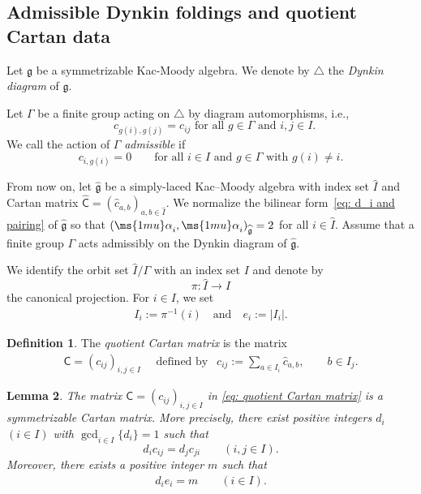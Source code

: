 \documentclass[12pt, leqno]{amsart}
\numberwithin{equation}{section}
\theoremstyle{plain}
\newtheorem{lemma}{Lemma}[section]
\theoremstyle{definition}
\newtheorem{definition}[lemma]{Definition}
\newcommand{\seteq}{\mathbin{:=}}
\newcommand{\g}{\mathfrak{g}}
\newcommand{\al}{{\ms{1mu}\alpha}}
\newcommand{\Dynkin}{\triangle}
\newcommand{\hI}{\widehat{I}}
\newcommand{\hc}{\widehat{c}}
\newcommand{\hg}{{\widehat{\g}}}
\newcommand{\sfC}{\mathsf{C}}
\newcommand{\hsfC}{\widehat{\sfC}}
\newcommand{\qtq}[1][{and}]{\quad\text{{#1}}\quad}
\begin{document}
\subsection{Admissible Dynkin foldings and quotient Cartan data}
\label{subsec: admissible folding}

Let $\g$ be a symmetrizable Kac-Moody algebra. We denote by $\Dynkin$ the \emph{Dynkin diagram} of $\g$.

Let $\Gamma$ be a finite group acting on $\Dynkin$ by diagram automorphisms, i.e.,
$$\text{ $c_{g(i),g(j)}=c_{ij}$ for all $g\in \Gamma$ and $i,j\in I$.}$$
We call the action of $\Gamma$ \emph{admissible} if
\[
c_{i,g(i)}=0
\qquad
\text{for all $i\in I$ and $g\in \Gamma$ with $g(i)\ne i$}.
\]

From now on, let $\hg$ be a simply-laced Kac--Moody algebra
with index set $\hI$ and Cartan matrix
$\hsfC=(\hc_{a,b})_{a,b\in\hI}$.
We normalize the bilinear form~\eqref{eq: d_i and pairing} of $\hg$ so that $(\al_i,\al_i)_\hg=2$ for all $i \in \hI$.
Assume that a finite group $\Gamma$ acts admissibly on the Dynkin diagram
of $\hg$.

We identify the orbit set $\hI/\Gamma$ with an index set $I$ and
denote by
\[
\pi:\hI\longrightarrow I
\]
the canonical projection.  For $i\in I$, we set
\begin{align} \label{eq: I_i and e_i}
I_i:=\pi^{-1}(i)
\qtq
e_i:=|I_i|.
\end{align}

\begin{definition}\label{def: admissible quotient Cartan datum}
The \emph{quotient Cartan matrix} is the matrix \begin{align} \label{eq: quotient Cartan matrix}
\sfC=(c_{ij})_{i,j\in I}
\quad
\text{ defined by } \ \
c_{ij} \seteq \sum_{a\in I_i}\hc_{a,b},
\qquad b\in I_j.
\end{align}
\end{definition}

\begin{lemma}
\label{lem: quotient Cartan}
The matrix $\sfC=(c_{ij})_{i,j\in I}$ in
\eqref{eq: quotient Cartan matrix} is a symmetrizable Cartan matrix.
More precisely, there exist positive integers $d_i$ $(i\in I)$
with
$\gcd_{i\in I}\{d_i \}=1$
such that
\[
d_i c_{ij}=d_j c_{ji} \qquad (i,j\in I).
\]
Moreover, there exists a positive integer $m$ such that
\begin{align}
\label{eq: d_i e_i constant}
d_i e_i=m
\qquad (i\in I).
\end{align}
\end{lemma}
\end{document}
